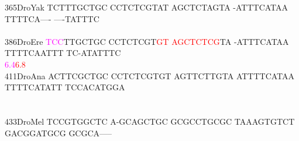 \documentclass[11pt,twoside,reqno,a4paper]{article}
\begin{document}
{365\hspace*{1\charwidth}DroYak	TCTTTGCTGC	CCTCTCGTAT	AGCTCTAGTA	-ATTTCATAA	TTTTCA----	----TATTTC	\\
\hspace*{4\charwidth}\hspace*{7\charwidth}\hspace*{1\charwidth}\hspace*{1\charwidth}\hspace*{1\charwidth}\hspace*{1\charwidth}\hspace*{1\charwidth}\hspace*{1\charwidth}\\
386\hspace*{1\charwidth}DroEre	\textcolor{magenta}{T}\textcolor{magenta}{C}\textcolor{magenta}{C}TTGCTGC	CCTCTCGT\textcolor{red}{G}\textcolor{red}{T}	\textcolor{red}{A}\textcolor{red}{G}\textcolor{red}{C}\textcolor{red}{T}\textcolor{red}{C}\textcolor{red}{T}\textcolor{red}{C}\textcolor{red}{G}TA	-ATTTCATAA	TTTTCAATTT	TC-ATATTTC	\\
\hspace*{4\charwidth}\hspace*{7\charwidth}\hspace*{0\charwidth}\textcolor{magenta}{6.4}\hspace*{1\charwidth}\hspace*{15\charwidth}\textcolor{red}{6.8}\hspace*{1\charwidth}\hspace*{1\charwidth}\hspace*{1\charwidth}\hspace*{1\charwidth}\hspace*{1\charwidth}\\
411\hspace*{1\charwidth}DroAna	ACTTCGCTGC	CCTCTCGTGT	AGTTCTTGTA	ATTTTCATAA	TTTTCATATT	TCCACATGGA	\\
\hspace*{4\charwidth}\hspace*{7\charwidth}\hspace*{1\charwidth}\hspace*{1\charwidth}\hspace*{1\charwidth}\hspace*{1\charwidth}\hspace*{1\charwidth}\hspace*{1\charwidth}\\
\\
433\hspace*{1\charwidth}DroMel	TCCGTGGCTC	A-GCAGCTGC	GCGCCTGCGC	TAAAGTGTCT	GACGGATGCG	GCGCA-----	\\
}
\end{document}
